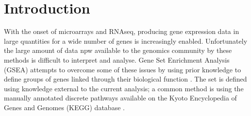 \documentclass[12pt]{article} %
\begin{document}
%	
	
	\section{Introduction}	

	
	
	With the onset of microarrays and RNAseq, producing gene expression data in large quantities for a wide number of genes is increasingly enabled. Unfortunately the large amount of data npw available to the genomics community by these methods is difficult to interpret and analyse. Gene Set Enrichment Analysis (GSEA) attempts to overcome some of these issues by using prior knowledge to define groups of genes linked through their biological function \cite{HejblumTimeCourseGeneSet2015}. The set is defined using knowledge external to the current analysis; a common method is using the manually annotated discrete pathways available on the Kyoto Encyclopedia of Genes and Genomes (KEGG) database \cite{FridleyGenesetanalysis2011}.
	
\end{document}
